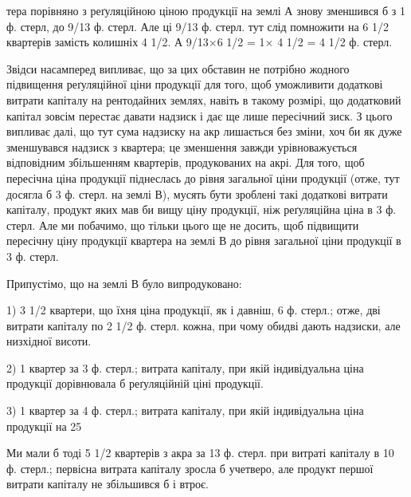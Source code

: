 тера порівняно з реґуляційною ціною продукції на землі А знову зменшився
б з 1 ф. стерл, до 9/13 ф. стерл. Але ці 9/13 ф. стерл. тут слід
помножити на 6 1/2 квартерів замість колишніх 4 1/2. А 9/13×6 1/2 = 1× 4 1/2 = 4 1/2 ф. стерл.

Звідси насамперед випливає, що за цих обставин не потрібно жодного підвищення
реґуляційної ціни продукції для того, щоб уможливити додаткові витрати
капіталу на рентодайних землях, навіть в такому розмірі, що додатковий
капітал зовсім перестає давати надзиск і дає ще лише пересічний зиск. З
цього випливає далі, що тут сума надзиску на акр лишається без зміни,
хоч би як дуже зменшувався надзиск з квартера; це зменшення завжди урівноважується
відповідним збільшенням квартерів, продукованих на акрі. Для того,
щоб пересічна ціна продукції піднеслась до рівня загальної ціни продукції (отже,
тут досягла б 3 ф. стерл. на землі В), мусять бути зроблені такі додаткові витрати
капіталу, продукт яких мав би вищу ціну продукції, ніж реґуляційна ціна
в 3 ф. стерл. Але ми побачимо, що тільки цього ще не досить, щоб підвищити
пересічну ціну продукції квартера на землі В до рівня загальної ціни продукції
в 3 ф. стерл.

Припустімо, що на землі В було випродуковано:

1) 3 1/2 квартери, що їхня ціна продукції, як і давніш, 6 ф. стерл.; отже,
дві витрати капіталу по  2 1/2 ф. стерл. кожна, при чому обидві дають надзиски,
але низхідної висоти.

2) 1 квартер за 3 ф. стерл.; витрата капіталу, при якій індивідуальна
ціна продукції дорівнювала б реґуляційній ціні продукції.

3) 1 квартер за 4 ф. стерл.; витрата капіталу, при якій індивідуальна
ціна продукції на 25 %

Ми мали б тоді 5 1/2  квартерів з акра за 13 ф. стерл. при витраті капіталу
в 10 ф. стерл.; первісна витрата капіталу зросла б учетверо, але продукт
першої витрати капіталу не збільшився б і втроє.

